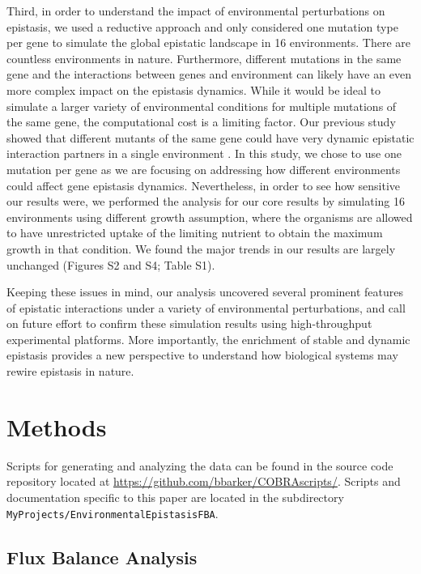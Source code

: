 Third, in order to understand the impact of environmental
perturbations on epistasis, we used a reductive approach and only
considered one mutation type per gene to simulate the global epistatic
landscape in 16 environments. There are countless environments in
nature. Furthermore, different mutations in the same gene and the
interactions between genes and environment can likely have an even
more complex impact on the epistasis dynamics. While it would be ideal
to simulate a larger variety of environmental conditions for multiple
mutations of the same gene, the computational cost is a limiting
factor. Our previous study showed that different mutants of the same
gene could have very dynamic epistatic interaction partners in a
single environment \citep{Xu2012}. In this study, we chose to use one
mutation per gene as we are focusing on addressing how different
environments could affect gene epistasis dynamics. Nevertheless, in
order to see how sensitive our results were, we performed the analysis
for our core results by simulating 16 environments using different
growth assumption, where the organisms are allowed to have
unrestricted uptake of the limiting nutrient to obtain the maximum
growth in that condition. We found the major trends in our results are
largely unchanged (Figures S2 and S4; Table S1).

Keeping these issues in mind, our analysis uncovered several prominent
features of epistatic interactions under a variety of environmental
perturbations, and call on future effort to confirm these simulation
results using high-throughput experimental platforms. More
importantly, the enrichment of stable and dynamic epistasis provides a
new perspective to understand how biological systems may rewire
epistasis in nature.

\section{Methods}

Scripts for generating and analyzing the data can be found in the
source code repository located at
\url{https://github.com/bbarker/COBRAscripts/}. Scripts and
documentation specific to this paper are located in the subdirectory
\texttt{MyProjects/EnvironmentalEpistasisFBA}.

\subsection{Flux Balance Analysis}

